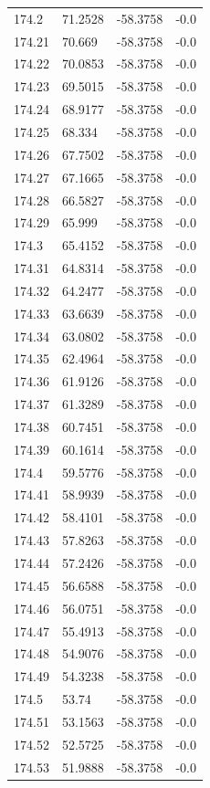 \begin{table}[H]
\begin{tabular}{llll}
174.2 & 71.2528 & -58.3758 & -0.0 \\
174.21 & 70.669 & -58.3758 & -0.0 \\
174.22 & 70.0853 & -58.3758 & -0.0 \\
174.23 & 69.5015 & -58.3758 & -0.0 \\
174.24 & 68.9177 & -58.3758 & -0.0 \\
174.25 & 68.334 & -58.3758 & -0.0 \\
174.26 & 67.7502 & -58.3758 & -0.0 \\
174.27 & 67.1665 & -58.3758 & -0.0 \\
174.28 & 66.5827 & -58.3758 & -0.0 \\
174.29 & 65.999 & -58.3758 & -0.0 \\
174.3 & 65.4152 & -58.3758 & -0.0 \\
174.31 & 64.8314 & -58.3758 & -0.0 \\
174.32 & 64.2477 & -58.3758 & -0.0 \\
174.33 & 63.6639 & -58.3758 & -0.0 \\
174.34 & 63.0802 & -58.3758 & -0.0 \\
174.35 & 62.4964 & -58.3758 & -0.0 \\
174.36 & 61.9126 & -58.3758 & -0.0 \\
174.37 & 61.3289 & -58.3758 & -0.0 \\
174.38 & 60.7451 & -58.3758 & -0.0 \\
174.39 & 60.1614 & -58.3758 & -0.0 \\
174.4 & 59.5776 & -58.3758 & -0.0 \\
174.41 & 58.9939 & -58.3758 & -0.0 \\
174.42 & 58.4101 & -58.3758 & -0.0 \\
174.43 & 57.8263 & -58.3758 & -0.0 \\
174.44 & 57.2426 & -58.3758 & -0.0 \\
174.45 & 56.6588 & -58.3758 & -0.0 \\
174.46 & 56.0751 & -58.3758 & -0.0 \\
174.47 & 55.4913 & -58.3758 & -0.0 \\
174.48 & 54.9076 & -58.3758 & -0.0 \\
174.49 & 54.3238 & -58.3758 & -0.0 \\
174.5 & 53.74 & -58.3758 & -0.0 \\
174.51 & 53.1563 & -58.3758 & -0.0 \\
174.52 & 52.5725 & -58.3758 & -0.0 \\
174.53 & 51.9888 & -58.3758 & -0.0 \\

\end{tabular}
\end{table}
